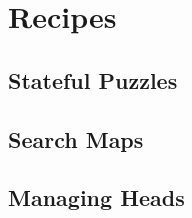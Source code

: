 \documentclass[oneside]{book}
\begin{document}
\chapter{Recipes}

\section{Stateful Puzzles}
\blindtext

\section{Search Maps}
\blindtext

\section{Managing Heads}
\blindtext
















\begin{versionhistory}
\end{versionhistory}
\end{document}
